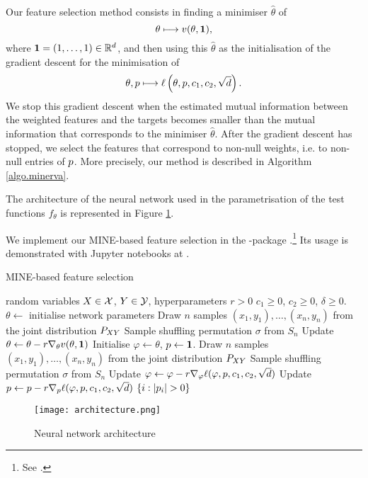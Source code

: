 Our feature selection method
consists in
finding a minimiser 
$\hat{\theta}$ of 
\begin{equation*}
\theta \longmapsto {v}(\theta, \mathbf{1}),
\end{equation*}
where $\mathbf{1} = (1, \dots, 1) \in \mathbb{R}^{d}$,
and then using this $\hat{\theta}$
as the initialisation of the gradient descent 
for the minimisation of 
\begin{equation*}
	\theta, {p} \longmapsto {\ell}\left(\theta, {p}, c_1, c_2, \sqrt{d}\right).
\end{equation*}
We stop this gradient descent 
when 
the estimated mutual information 
between 
the weighted features
and
the targets
becomes smaller than 
the mutual information 
that corresponds to the minimiser 
$\hat{\theta}$.
After the gradient descent has stopped,
we select the features that correspond to non-null weights,
i.e. to non-null entries of ${p}$.
More precisely, our method is described in Algorithm \ref{algo.minerva}.

The architecture 
of 
the neural network 
used in 
the parametrisation  of the test functions 
$f_\theta$
is represented in 
Figure
\ref{fig.networkarchitecture}.

We implement our MINE-based feature selection in the 
-package 
.\footnote{
	See
	.
}
Its usage is demonstrated 
with Jupyter notebooks
at
.

\begin{algorithm}
	\caption{MINE-based feature selection}
	\label{algo.minerva}
	\begin{algorithmic}[1]
		\REQUIRE
		random variables
		$X\in \mathcal{X}$,
		$Y\in \mathcal{Y}$,
		hyperparameters
		$r>0$
		$c_1\geq 0$, $c_2\geq 0$,
		$\delta \geq 0$.
		\STATE $\theta \leftarrow$ initialise network parameters
		\REPEAT
		\STATE Draw $n$ samples $(x_1, y_1), \dots, (x_n, y_n)$ from the joint distribution ${{P}}_{XY}$
		\STATE Sample shuffling permutation $\sigma$ from $S_n$
		\STATE Update $\theta \leftarrow \theta - r\nabla_{\theta}{v}(\theta, \mathbf{1})$%
		\STATE Initialise $\varphi \leftarrow \theta$, ${p} \leftarrow \mathbf{1}$.
		\REPEAT
		\STATE Draw $n$ samples $(x_1, y_1), \dots, (x_n, y_n)$ from the joint distribution ${{P}}_{XY}$
		\STATE Sample shuffling permutation $\sigma$ from $S_n$
		\STATE Update $\varphi \leftarrow \varphi - r \nabla_{\varphi}{\ell}(\varphi, {p}, c_1, c_2, \sqrt{d})$
		\STATE Update ${p} \leftarrow {p} - r \nabla_{{p}}{\ell}(\varphi, {p}, c_1, c_2, \sqrt{d})$
		\RETURN $\left\lbrace i: \left\lvert {{p}_i} \right\rvert > 0\right\rbrace$
	\end{algorithmic}
\end{algorithm}

\begin{figure}
	\caption{Neural network architecture}
	\label{fig.networkarchitecture}
	\texttt{[image: architecture.png]}
\end{figure}





